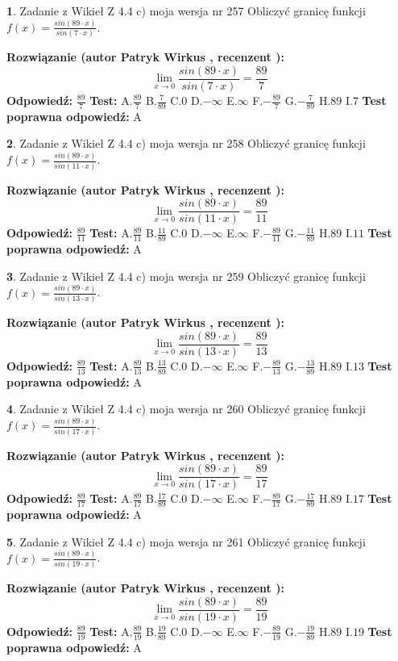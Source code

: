 \documentclass[12pt, a4paper]{article}
\theoremstyle{definition} %
\newtheorem{zad}{}
\newcommand{\zadStart}[1]{\begin{zad}#1\newline}
\newcommand{\zadStop}{\end{zad}}
\newcommand{\rozwStart}[2]{\noindent \textbf{Rozwiązanie (autor #1 , recenzent #2): }\newline}
\newcommand{\rozwStop}{\newline}
\newcommand{\odpStart}{\noindent \textbf{Odpowiedź:}\newline}
\newcommand{\odpStop}{\newline}
\newcommand{\testStart}{\noindent \textbf{Test:}\newline}
\newcommand{\testStop}{\newline}
\newcommand{\kluczStart}{\noindent \textbf{Test poprawna odpowiedź:}\newline}
\newcommand{\kluczStop}{\newline}
\begin{document}
\zadStart{Zadanie z Wikieł Z 4.4 c) moja wersja nr 257}
Obliczyć granicę funkcji $f(x)=\frac{sin(89\cdot x)}{sin(7\cdot x)}$.
\zadStop
\rozwStart{Patryk Wirkus}{}
$$\lim\limits_{x\to 0}\frac{sin(89\cdot x)}{sin(7\cdot x)}=
\frac{89}{7}$$
\rozwStop
\odpStart
$\frac{89}{7}$
\odpStop
\testStart
A.$\frac{89}{7}$
B.$\frac{7}{89}$
C.$0$
D.$-\infty$
E.$\infty$
F.$-\frac{89}{7}$
G.$-\frac{7}{89}$
H.$89$
I.$7$
\testStop
\kluczStart
A
\kluczStop



\zadStart{Zadanie z Wikieł Z 4.4 c) moja wersja nr 258}
Obliczyć granicę funkcji $f(x)=\frac{sin(89\cdot x)}{sin(11\cdot x)}$.
\zadStop
\rozwStart{Patryk Wirkus}{}
$$\lim\limits_{x\to 0}\frac{sin(89\cdot x)}{sin(11\cdot x)}=
\frac{89}{11}$$
\rozwStop
\odpStart
$\frac{89}{11}$
\odpStop
\testStart
A.$\frac{89}{11}$
B.$\frac{11}{89}$
C.$0$
D.$-\infty$
E.$\infty$
F.$-\frac{89}{11}$
G.$-\frac{11}{89}$
H.$89$
I.$11$
\testStop
\kluczStart
A
\kluczStop



\zadStart{Zadanie z Wikieł Z 4.4 c) moja wersja nr 259}
Obliczyć granicę funkcji $f(x)=\frac{sin(89\cdot x)}{sin(13\cdot x)}$.
\zadStop
\rozwStart{Patryk Wirkus}{}
$$\lim\limits_{x\to 0}\frac{sin(89\cdot x)}{sin(13\cdot x)}=
\frac{89}{13}$$
\rozwStop
\odpStart
$\frac{89}{13}$
\odpStop
\testStart
A.$\frac{89}{13}$
B.$\frac{13}{89}$
C.$0$
D.$-\infty$
E.$\infty$
F.$-\frac{89}{13}$
G.$-\frac{13}{89}$
H.$89$
I.$13$
\testStop
\kluczStart
A
\kluczStop



\zadStart{Zadanie z Wikieł Z 4.4 c) moja wersja nr 260}
Obliczyć granicę funkcji $f(x)=\frac{sin(89\cdot x)}{sin(17\cdot x)}$.
\zadStop
\rozwStart{Patryk Wirkus}{}
$$\lim\limits_{x\to 0}\frac{sin(89\cdot x)}{sin(17\cdot x)}=
\frac{89}{17}$$
\rozwStop
\odpStart
$\frac{89}{17}$
\odpStop
\testStart
A.$\frac{89}{17}$
B.$\frac{17}{89}$
C.$0$
D.$-\infty$
E.$\infty$
F.$-\frac{89}{17}$
G.$-\frac{17}{89}$
H.$89$
I.$17$
\testStop
\kluczStart
A
\kluczStop



\zadStart{Zadanie z Wikieł Z 4.4 c) moja wersja nr 261}
Obliczyć granicę funkcji $f(x)=\frac{sin(89\cdot x)}{sin(19\cdot x)}$.
\zadStop
\rozwStart{Patryk Wirkus}{}
$$\lim\limits_{x\to 0}\frac{sin(89\cdot x)}{sin(19\cdot x)}=
\frac{89}{19}$$
\rozwStop
\odpStart
$\frac{89}{19}$
\odpStop
\testStart
A.$\frac{89}{19}$
B.$\frac{19}{89}$
C.$0$
D.$-\infty$
E.$\infty$
F.$-\frac{89}{19}$
G.$-\frac{19}{89}$
H.$89$
I.$19$
\testStop
\kluczStart
A
\kluczStop
\end{document}
